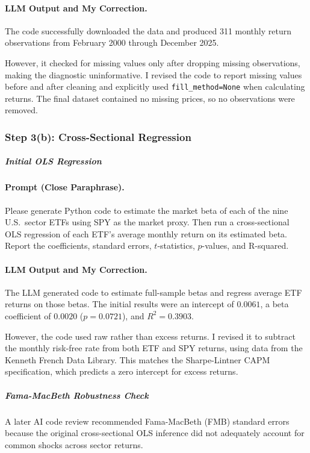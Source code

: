 \paragraph{LLM Output and My Correction.} The code successfully downloaded the
data and produced 311 monthly return observations from February 2000 through
December 2025.

However, it checked for missing values only after dropping missing
observations, making the diagnostic uninformative. I revised the code to report
missing values before and after cleaning and explicitly used
\texttt{fill\_method=None} when calculating returns. The final dataset
contained no missing prices, so no observations were removed.

\subsubsection*{Step 3(b): Cross-Sectional Regression}

\subparagraph*{Initial OLS Regression}

\paragraph{Prompt (Close Paraphrase).} Please generate Python code to estimate
the market beta of each of the nine U.S.\ sector ETFs using SPY as the market
proxy. Then run a cross-sectional OLS regression of each ETF's average monthly
return on its estimated beta. Report the coefficients, standard errors,
$t$-statistics, $p$-values, and R-squared.

\paragraph{LLM Output and My Correction.} The LLM generated code to estimate
full-sample betas and regress average ETF returns on those betas. The initial
results were an intercept of $0.0061$, a beta coefficient of $0.0020$
($p = 0.0721$), and $R^2 = 0.3903$.

However, the code used raw rather than excess returns. I revised it to subtract
the monthly risk-free rate from both ETF and SPY returns, using data from the
Kenneth French Data Library. This matches the Sharpe-Lintner CAPM
specification, which predicts a zero intercept for excess returns.

\subparagraph*{Fama-MacBeth Robustness Check}

A later AI code review recommended Fama-MacBeth (FMB) standard errors because
the original cross-sectional OLS inference did not adequately account for
common shocks across sector returns.

